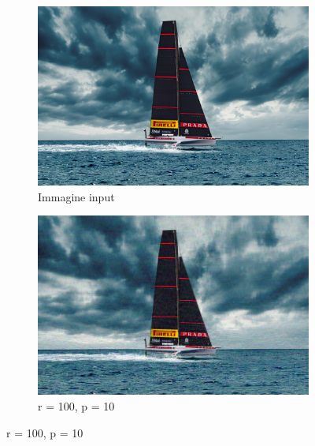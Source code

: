 \documentclass{article}
\begin{document}
\begin{figure}[h]
  \centering

  \begin{subfigure}{0.2\textwidth}
    \includegraphics[width=\textwidth]{luna_rossa.png}
    \caption{Immagine input}
    \label{fig:sub1}
  \end{subfigure}
  \hfill
  \begin{subfigure}{0.45\textwidth}
    \includegraphics[width=\linewidth]{luna_rossa_out10010.png}
    \caption{r = 100, p = 10}
    \label{fig:sub2}
  \end{subfigure}

  \vspace{\baselineskip} %


\end{figure}
\end{document}
